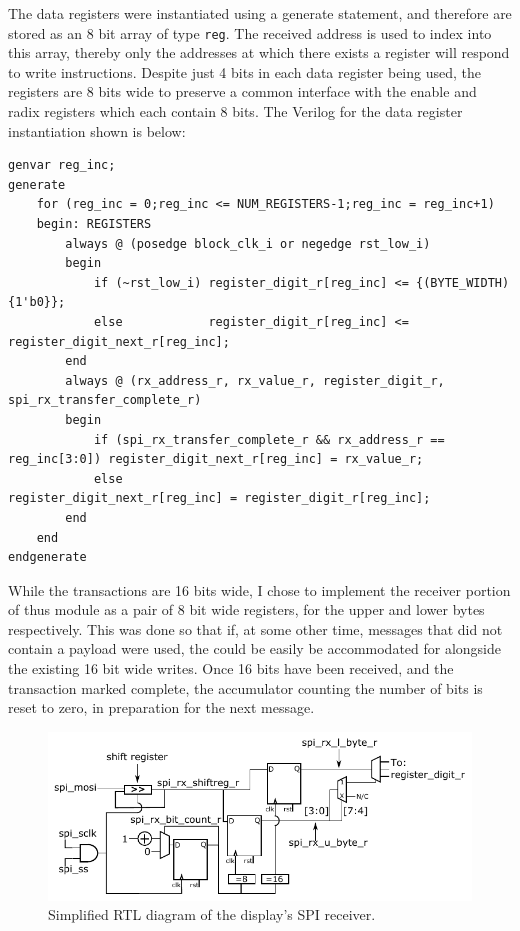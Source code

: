 \documentclass[11pt,british]{report}
\begin{document}
The data registers were instantiated using a generate statement, and therefore are stored as an 8 bit array of type \texttt{reg}. The received address is used to index into this array, thereby only the addresses at which there exists a register will respond to write instructions. Despite just 4 bits in each data register being used, the registers are 8 bits wide to preserve a common interface with the enable and radix registers which each contain 8 bits. The Verilog for the data register instantiation shown is below:
\begin{lstlisting}[style={verilog-style}]
genvar reg_inc;
generate
    for (reg_inc = 0;reg_inc <= NUM_REGISTERS-1;reg_inc = reg_inc+1)
    begin: REGISTERS
        always @ (posedge block_clk_i or negedge rst_low_i)
        begin
            if (~rst_low_i) register_digit_r[reg_inc] <= {(BYTE_WIDTH){1'b0}};
            else            register_digit_r[reg_inc] <= register_digit_next_r[reg_inc];
        end
        always @ (rx_address_r, rx_value_r, register_digit_r, spi_rx_transfer_complete_r)
        begin
            if (spi_rx_transfer_complete_r && rx_address_r == reg_inc[3:0]) register_digit_next_r[reg_inc] = rx_value_r;
            else                                                            register_digit_next_r[reg_inc] = register_digit_r[reg_inc];
        end
    end
endgenerate
\end{lstlisting}

While the transactions are 16 bits wide, I chose to implement the receiver portion of thus module as a pair of 8 bit wide registers, for the upper and lower bytes respectively. This was done so that if, at some other time, messages that did not contain a payload were used, the could be easily be accommodated for alongside the existing 16 bit wide writes. Once 16 bits have been received, and the transaction marked complete, the accumulator counting the number of bits is reset to zero, in preparation for the next message.
\begin{figure}[h]
	\centering
	\includegraphics[width=\textwidth]{../rtl_diagrams/display_rx}
	\caption{Simplified RTL diagram of the display's SPI receiver.}
	\label{fig:simple_spi_rx}
\end{figure}
\end{document}

